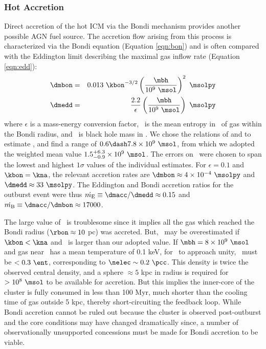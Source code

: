 \documentclass[iop]{emulateapj}
\begin{document}
\subsubsection{Hot Accretion}

Direct accretion of the hot ICM via the Bondi mechanism provides
another possible AGN fuel source. The accretion flow arising from this
process is characterized via the Bondi equation (Equation
\ref{eqn:bon}) and is often compared with the Eddington limit
describing the maximal gas inflow rate (Equation \ref{eqn:edd}):
\begin{eqnarray}
  \dmbon &=& 0.013 ~\kbon^{-3/2} \left(\frac{\mbh}{10^9
    ~\msol}\right)^{2} ~\msolpy \label{eqn:bon}\\
  \dmedd &=& \frac{2.2}{\epsilon} \left(\frac{\mbh}{10^9~\msol}\right)
  ~\msolpy  \label{eqn:edd}
\end{eqnarray}
where $\epsilon$ is a mass-energy conversion factor, \kbon\ is the
mean entropy in \ent\ of gas within the Bondi radius, and \mbh\ is
black hole mass in \msol. We chose the relations of
\citet{2002ApJ...574..740T} and \citet{2007MNRAS.379..711G} to
estimate \mbh, and find a range of $0.6 \dash 7.8 \times 10^9 ~\msol$,
from which we adopted the weighted mean value $1.5^{+6.3}_{-0.9}
\times 10^9 ~\msol$. The errors on \mbh\ were chosen to span the
lowest and highest $1\sigma$ values of the individual estimates. For
$\epsilon = 0.1$ and $\kbon = \kna$, the relevant accretion rates are
$\dmbon \approx 4 \times 10^{-4} ~\msolpy$ and $\dmedd \approx 33
~\msolpy$. The Eddington and Bondi accretion ratios for the outburst
event were thus $\dme \equiv \dmacc/\dmedd \approx 0.15$ and $\dmb
\equiv \dmacc/\dmbon \approx 17000$.

The large value of \dmb\ is troublesome since it implies all the gas
which reached the Bondi radius ($\rbon \approx 10$ pc) was
accreted. But, \dmb\ may be overestimated if $\kbon < \kna$ and
\mbh\ is larger than our adopted value. If $\mbh = 8 \times 10^9
~\msol$ and gas near \rbon\ has a mean temperature of 0.1 keV, for
\dmb\ to approach unity, \kbon\ must be $< 0.3 ~\ent$, corresponding
to $\nelec \sim 0.2 ~\pcc$. This density is twice the observed central
density, and a sphere $\approx 5$ kpc in radius is required for $>
10^8 ~\msol$ to be available for accretion. But this implies the
inner-core of the cluster is fully consumed in less than 100 Myr, much
shorter than the cooling time of gas outside 5 kpc, thereby
short-circuiting the feedback loop. While Bondi accretion cannot be
ruled out because the cluster is observed post-outburst and the core
conditions may have changed dramatically since, a number of
observationally unsupported concessions must be made for Bondi
accretion to be viable.
\end{document}
